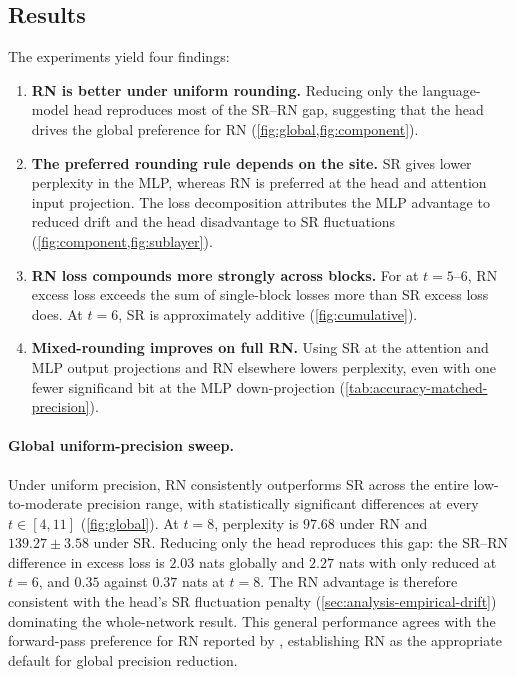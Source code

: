 \subsection{Results}
\label{sec:exp-results}

The experiments yield four findings:
\begin{enumerate}[label=(\roman*),leftmargin=2em]
  \item \textbf{RN is better under uniform rounding.}
        Reducing only the language-model head reproduces most of the
        SR--RN gap, suggesting that the head drives the global preference
        for RN (\cref{fig:global,fig:component}).

  \item \textbf{The preferred rounding rule depends on the site.}
        SR gives lower perplexity in the MLP, whereas RN is preferred at
        the head and attention input projection. The loss decomposition
        attributes the MLP advantage to reduced drift and the head
        disadvantage to SR fluctuations
        (\cref{fig:component,fig:sublayer}).

  \item \textbf{RN loss compounds more strongly across blocks.}
        For  at $t=5$--$6$, RN excess loss exceeds
        the sum of single-block losses more than SR excess loss does.
        At $t=6$, SR is approximately additive
        (\cref{fig:cumulative}).

  \item \textbf{Mixed-rounding improves on full RN.}
        Using SR at the attention and MLP output projections and RN
        elsewhere lowers perplexity, even with one fewer significand
        bit at the MLP down-projection
        (\cref{tab:accuracy-matched-precision}).
\end{enumerate}

\paragraph{Global uniform-precision sweep.}
Under uniform precision, RN consistently outperforms SR across the entire
low-to-moderate precision range, with statistically significant differences at
every $t \in [4,11]$ (\cref{fig:global}). At $t=8$, perplexity is $97.68$ under
RN and $139.27\pm3.58$ under SR. Reducing only the head reproduces this gap: the
SR--RN difference in excess loss is $2.03$ nats globally and $2.27$ nats with
only  reduced at $t=6$, and $0.35$ against $0.37$ nats at $t=8$.
The RN advantage is therefore consistent with the head's SR fluctuation penalty
(\cref{sec:analysis-empirical-drift}) dominating the whole-network result. This
general performance agrees with the forward-pass preference for RN reported by
\citet{chmiel2023accurate}, establishing RN as the appropriate default for
global precision reduction.

